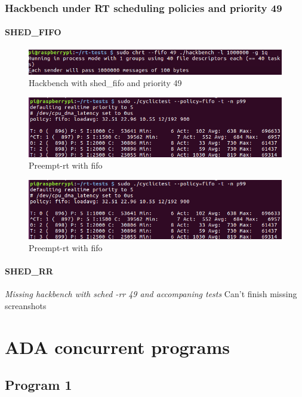 \documentclass[10pt,a4paper]{article}
\begin{document}
\subsubsection{Hackbench under RT scheduling policies and priority 49}
\paragraph{SHED\_FIFO}
\begin{figure}[H]
\includegraphics[width=16cm]{Hackbench2.png}
\caption{Hackbench with shed\_fifo and priority 49}
\end{figure}
\begin{figure}[H]
\includegraphics[width=16cm]{Preempt-Fifo-WithHackbench2.png}
\caption{Preempt-rt with fifo}
\end{figure}
\begin{figure}[H]
\includegraphics[width=16cm]{Preempt-Fifo-WithHackbench2.png}
\caption{Preempt-rt with fifo}
\end{figure}
\paragraph{SHED\_RR}
\emph{Missing hackbench with sched -rr 49 and accompaning tests}
Can't finish missing screanshots
\section{ADA concurrent programs}
\subsection{Program 1}
\end{document}
